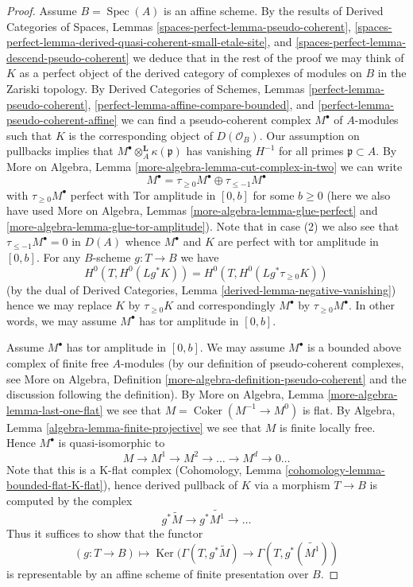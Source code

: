 \documentclass{stacks-project}
\theoremstyle{plain}
\theoremstyle{definition}
\theoremstyle{remark}
\numberwithin{equation}{subsection}
\def\Spec{\mathop{\mathrm{Spec}}}
\def\Ker{\mathop{\mathrm{Ker}}}
\def\Coker{\mathop{\mathrm{Coker}}}
\begin{document}
\begin{proof}
\medskip\noindent
Assume $B = \Spec(A)$ is an affine scheme. By the results of
Derived Categories of Spaces, Lemmas
\ref{spaces-perfect-lemma-pseudo-coherent},
\ref{spaces-perfect-lemma-derived-quasi-coherent-small-etale-site}, and
\ref{spaces-perfect-lemma-descend-pseudo-coherent}
we deduce that in the rest of the proof we may think of $K$ as a perfect
object of the derived category of complexes of modules on $B$
in the Zariski topology. By 
Derived Categories of Schemes, Lemmas
\ref{perfect-lemma-pseudo-coherent},
\ref{perfect-lemma-affine-compare-bounded}, and
\ref{perfect-lemma-pseudo-coherent-affine} we can find a pseudo-coherent
complex $M^\bullet$ of $A$-modules such that $K$ is the corresponding
object of $D(\mathcal{O}_B)$. Our assumption on pullbacks implies
that $M^\bullet \otimes^\mathbf{L}_A \kappa(\mathfrak p)$
has vanishing $H^{-1}$ for all primes $\mathfrak p \subset A$.
By More on Algebra, Lemma \ref{more-algebra-lemma-cut-complex-in-two}
we can write
$$
M^\bullet =
\tau_{\geq 0}M^\bullet \oplus \tau_{\leq - 1}M^\bullet
$$
with $\tau_{\geq 0}M^\bullet$ perfect with Tor amplitude in $[0, b]$
for some $b \geq 0$ (here we also have used
More on Algebra, Lemmas \ref{more-algebra-lemma-glue-perfect} and
\ref{more-algebra-lemma-glue-tor-amplitude}).
Note that in case (2) we also see that $\tau_{\leq - 1}M^\bullet = 0$
in $D(A)$ whence $M^\bullet$ and $K$ are perfect with
tor amplitude in $[0, b]$. For any $B$-scheme $g : T \to B$ we have
$$
H^0(T, H^0(Lg^*K)) = H^0(T, H^0(Lg^*\tau_{\geq 0}K))
$$
(by the dual of Derived Categories, Lemma
\ref{derived-lemma-negative-vanishing})
hence we may replace $K$ by $\tau_{\geq 0}K$ and correspondingly
$M^\bullet$ by $\tau_{\geq 0}M^\bullet$. In other words, we may
assume $M^\bullet$ has tor amplitude in $[0, b]$.

\medskip\noindent
Assume $M^\bullet$ has tor amplitude in $[0, b]$.
We may assume $M^\bullet$ is a bounded above complex of finite free
$A$-modules (by our definition of pseudo-coherent complexes, see
More on Algebra, Definition \ref{more-algebra-definition-pseudo-coherent}
and the discussion following the definition).
By More on Algebra, Lemma \ref{more-algebra-lemma-last-one-flat}
we see that $M = \Coker(M^{- 1} \to M^0)$ is flat. By
Algebra, Lemma \ref{algebra-lemma-finite-projective} we see that $M$
is finite locally free. Hence $M^\bullet$ is quasi-isomorphic to
$$
M \to M^1 \to M^2 \to \ldots \to M^d \to 0 \ldots
$$
Note that this is a K-flat complex
(Cohomology, Lemma \ref{cohomology-lemma-bounded-flat-K-flat}),
hence derived pullback of $K$ via a morphism $T \to B$ is computed
by the complex
$$
g^*\widetilde{M} \to g^*\widetilde{M^1} \to \ldots
$$
Thus it suffices to show that the functor
$$
(g : T \to B) \longmapsto
\Ker(
\Gamma(T,g^*\widetilde{M})
\to
\Gamma(T, g^*(\widetilde{M^1})
)
$$
is representable by an affine scheme of finite presentation over $B$.


\end{proof}
\end{document}
